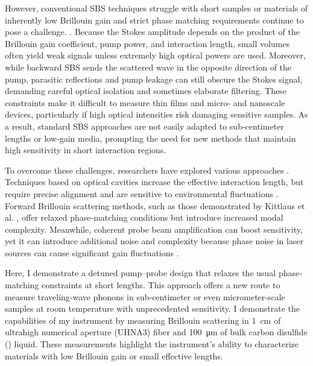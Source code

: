 However, conventional SBS techniques struggle with short samples or materials of inherently low Brillouin gain and strict phase matching requirements continue to pose a challenge. \cite{rakich2012giant, gyger2020observation, yu2024chip}. Because the Stokes amplitude depends on the product of the Brillouin gain coefficient, pump power, and interaction length, small volumes often yield weak signals unless extremely high optical powers are used. Moreover, while backward SBS sends the scattered wave in the opposite direction of the pump, parasitic reflections and pump leakage can still obscure the Stokes signal, demanding careful optical isolation and sometimes elaborate filtering. These constraints make it difficult to measure thin films and micro‐ and nanoscale devices, particularly if high optical intensities risk damaging sensitive samples. As a result, standard SBS approaches are not easily adapted to sub‐centimeter lengths or low‐gain media, prompting the need for new methods that maintain high sensitivity in short interaction regions.

To overcome these challenges, researchers have explored various approaches \cite{shin2013tailorable, van2015interaction, kittlaus2016large, djadaojee2020stimulated, gusev2018advances, gerakis2011coherent}. Techniques based on optical cavities increase the effective interaction length, but require precise alignment and are sensitive to environmental fluctuations \cite{pant2011cavity}. Forward Brillouin scattering methods, such as those demonstrated by Kittlaus et al. \cite{kittlaus2017chip}, offer relaxed phase‐matching conditions but introduce increased modal complexity. Meanwhile, coherent probe beam amplification can boost sensitivity, yet it can introduce additional noise and complexity because phase noise in laser sources can cause significant gain fluctuations \cite{shlomovits2015effect}.

Here, I demonstrate a detuned pump–probe design that relaxes the usual phase‐matching constraints at short lengths. This approach offers a new route to measure traveling‐wave phonons in sub‐centimeter or even micrometer‐scale samples at room temperature with unprecedented sensitivity. I demonstrate the capabilities of my instrument by measuring Brillouin scattering in \SI{1}{\centi\meter} of ultrahigh numerical aperture (UHNA3) fiber and \SI{100}{\micro\meter} of bulk carbon disulfide () liquid. These measurements highlight the instrument’s ability to characterize materials with low Brillouin gain or small effective lengths.

